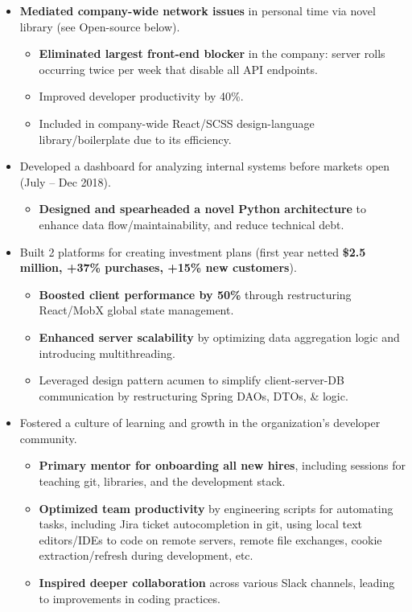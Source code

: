 \documentclass[10pt, letterpaper]{article}
\let\oldunderline\underline
\renewcommand{\underline}[1]{\oldunderline{\smash{#1}}}
\newcommand{\ul}[1]{%
    \begin{itemize}%
    #1%
    \end{itemize}%
}
\newcommand{\nonsecref}[1]{\hyperref[#1]{\underline{#1}}}
\begin{document}
\ul{
    \item \textbf{Mediated company-wide network issues} in personal time via novel \nonsecref{MockRequests} library (see Open-source below).

    \ul{
        \item \textbf{Eliminated largest front-end blocker} in the company: server rolls occurring twice per week that disable all API endpoints.

        \item Improved developer productivity by 40\%.

        \item Included in company-wide React/SCSS design-language library/boilerplate due to its efficiency.
    }

    \item Developed a dashboard for analyzing internal systems before markets open (July -- Dec 2018).

    \ul{
        \item \textbf{Designed and spearheaded a novel Python architecture} to enhance data flow/maintainability, and reduce technical debt.
    }

    \item Built 2 platforms for creating investment plans (first year netted \textbf{\$2.5 million, +37\% purchases, +15\% new customers}).

    \ul{
        \item \textbf{Boosted client performance by 50\%} through restructuring React/MobX global state management.

        \item \textbf{Enhanced server scalability} by optimizing data aggregation logic and introducing multithreading.

        \item Leveraged design pattern acumen to simplify client-server-DB communication by restructuring Spring DAOs, DTOs, \& logic.
    }

    \item Fostered a culture of learning and growth in the organization's developer community.

    \ul{
        \item \textbf{Primary mentor for onboarding all new hires}, including sessions for teaching git, libraries, and the development stack.

        \item \textbf{Optimized team productivity} by engineering scripts for automating tasks, including Jira ticket autocompletion in git, using local text editors/IDEs to code on remote servers, remote file exchanges, cookie extraction/refresh during development, etc.

        \item \textbf{Inspired deeper collaboration} across various Slack channels, leading to improvements in coding practices.
    }
}
\end{document}
